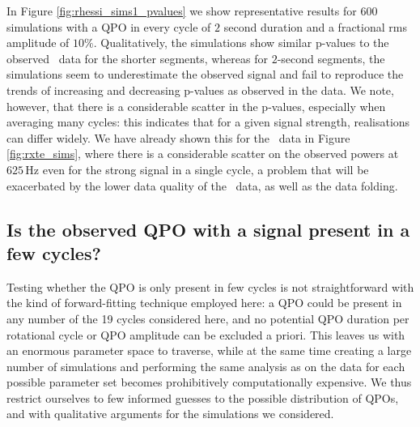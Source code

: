 \documentclass{emulateapj}
\begin{document}
In Figure \ref{fig:rhessi_sims1_pvalues} we show representative results for $600$ simulations with a QPO in every cycle of $2$ second duration and a fractional rms amplitude of $10\%$. Qualitatively, the simulations show similar p-values to the observed \rhessi\ data for the shorter segments, whereas for $2$-second segments, the simulations seem to underestimate the observed signal and fail to reproduce the trends of increasing and decreasing p-values as observed in the data. We note, however, that there is a considerable scatter in the p-values, especially when averaging many cycles: this indicates that for a given signal strength, realisations can differ widely. We have already shown this for the \rxte\ data in Figure \ref{fig:rxte_sims}, where there is a considerable scatter on the observed powers at $625 \, \mathrm{Hz}$ even for the strong signal in a single cycle, a problem that will be exacerbated by the lower data quality of the \rhessi\ data, as well as the data folding.



\subsection{Is the observed QPO with a signal present in a few cycles?}

Testing whether the QPO is only present in few cycles is not straightforward with the kind of forward-fitting technique employed here: a QPO could be present in any number of the 19 cycles considered here, and no potential QPO duration per rotational cycle or QPO amplitude can be excluded a priori. This leaves us with an enormous parameter space to traverse, while at the same time creating a large number of simulations and performing the same analysis as on the data for each possible parameter set becomes prohibitively computationally expensive. We thus restrict ourselves to few informed guesses to the possible distribution of QPOs, and with qualitative arguments for the simulations we considered. 
\end{document}
